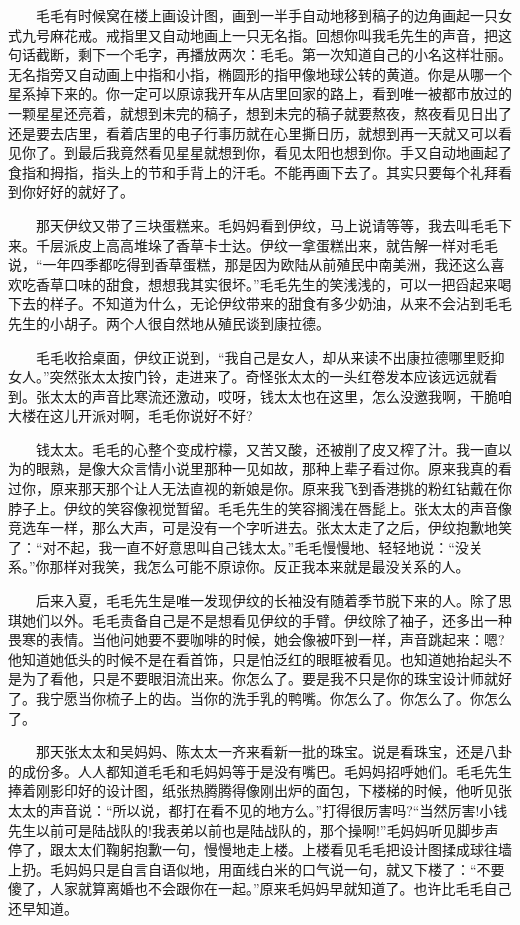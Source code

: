 \documentclass[12pt,UTF8]{ctexbook}
\begin{document}
　　毛毛有时候窝在楼上画设计图，画到一半手自动地移到稿子的边角画起一只女式九号麻花戒。戒指里又自动地画上一只无名指。回想你叫我毛先生的声音，把这句话截断，剩下一个毛字，再播放两次：毛毛。第一次知道自己的小名这样壮丽。无名指旁又自动画上中指和小指，椭圆形的指甲像地球公转的黄道。你是从哪一个星系掉下来的。你一定可以原谅我开车从店里回家的路上，看到唯一被都市放过的一颗星星还亮着，就想到未完的稿子，想到未完的稿子就要熬夜，熬夜看见日出了还是要去店里，看着店里的电子行事历就在心里撕日历，就想到再一天就又可以看见你了。到最后我竟然看见星星就想到你，看见太阳也想到你。手又自动地画起了食指和拇指，指头上的节和手背上的汗毛。不能再画下去了。其实只要每个礼拜看到你好好的就好了。

　　那天伊纹又带了三块蛋糕来。毛妈妈看到伊纹，马上说请等等，我去叫毛毛下来。千层派皮上高高堆垛了香草卡士达。伊纹一拿蛋糕出来，就告解一样对毛毛说，\enquote{一年四季都吃得到香草蛋糕，那是因为欧陆从前殖民中南美洲，我还这么喜欢吃香草口味的甜食，想想我其实很坏。}毛毛先生的笑浅浅的，可以一把舀起来喝下去的样子。不知道为什么，无论伊纹带来的甜食有多少奶油，从来不会沾到毛毛先生的小胡子。两个人很自然地从殖民谈到康拉德。

　　毛毛收拾桌面，伊纹正说到，\enquote{我自己是女人，却从来读不出康拉德哪里贬抑女人。}突然张太太按门铃，走进来了。奇怪张太太的一头红卷发本应该远远就看到。张太太的声音比寒流还激动，哎呀，钱太太也在这里，怎么没邀我啊，干脆咱大楼在这儿开派对啊，毛毛你说好不好?

　　钱太太。毛毛的心整个变成柠檬，又苦又酸，还被削了皮又榨了汁。我一直以为的眼熟，是像大众言情小说里那种一见如故，那种上辈子看过你。原来我真的看过你，原来那天那个让人无法直视的新娘是你。原来我飞到香港挑的粉红钻戴在你脖子上。伊纹的笑容像视觉暂留。毛毛先生的笑容搁浅在唇髭上。张太太的声音像竞选车一样，那么大声，可是没有一个字听进去。张太太走了之后，伊纹抱歉地笑了：\enquote{对不起，我一直不好意思叫自己钱太太。}毛毛慢慢地、轻轻地说：\enquote{没关系。}你那样对我笑，我怎么可能不原谅你。反正我本来就是最没关系的人。

　　后来入夏，毛毛先生是唯一发现伊纹的长袖没有随着季节脱下来的人。除了思琪她们以外。毛毛责备自己是不是想看见伊纹的手臂。伊纹除了袖子，还多出一种畏寒的表情。当他问她要不要咖啡的时候，她会像被吓到一样，声音跳起来：嗯?他知道她低头的时候不是在看首饰，只是怕泛红的眼眶被看见。也知道她抬起头不是为了看他，只是不要眼泪流出来。你怎么了。要是我不只是你的珠宝设计师就好了。我宁愿当你梳子上的齿。当你的洗手乳的鸭嘴。你怎么了。你怎么了。你怎么了。

　　那天张太太和吴妈妈、陈太太一齐来看新一批的珠宝。说是看珠宝，还是八卦的成份多。人人都知道毛毛和毛妈妈等于是没有嘴巴。毛妈妈招呼她们。毛毛先生捧着刚影印好的设计图，纸张热腾腾得像刚出炉的面包，下楼梯的时候，他听见张太太的声音说：\enquote{所以说，都打在看不见的地方么。}打得很厉害吗?\enquote{当然厉害!小钱先生以前可是陆战队的!我表弟以前也是陆战队的，那个操啊!}毛妈妈听见脚步声停了，跟太太们鞠躬抱歉一句，慢慢地走上楼。上楼看见毛毛把设计图揉成球往墙上扔。毛妈妈只是自言自语似地，用面线白米的口气说一句，就又下楼了：\enquote{不要傻了，人家就算离婚也不会跟你在一起。}原来毛妈妈早就知道了。也许比毛毛自己还早知道。
\end{document}
